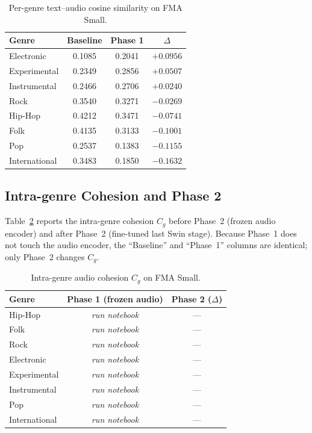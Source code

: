 \documentclass[11pt]{article}
\begin{document}
\begin{table}[h]
\centering
\label{tab:genre_align}
\begin{tabular}{lccc}
\toprule
\textbf{Genre} & \textbf{Baseline} & \textbf{Phase 1} & \textbf{$\Delta$} \\
\midrule
Electronic    & 0.1085 & 0.2041 & $+0.0956$ \\
Experimental  & 0.2349 & 0.2856 & $+0.0507$ \\
Instrumental  & 0.2466 & 0.2706 & $+0.0240$ \\
Rock          & 0.3540 & 0.3271 & $-0.0269$ \\
Hip-Hop       & 0.4212 & 0.3471 & $-0.0741$ \\
Folk          & 0.4135 & 0.3133 & $-0.1001$ \\
Pop           & 0.2537 & 0.1383 & $-0.1155$ \\
International & 0.3483 & 0.1850 & $-0.1632$ \\
\bottomrule
\end{tabular}
\caption{Per-genre text--audio cosine similarity on FMA Small.}
\end{table}

\subsection{Intra-genre Cohesion and Phase 2}

Table~\ref{tab:cohesion} reports the intra-genre cohesion $C_g$ before Phase~2
(frozen audio encoder) and after Phase~2 (fine-tuned last Swin stage). Because
Phase~1 does not touch the audio encoder, the ``Baseline'' and ``Phase~1'' columns
are identical; only Phase~2 changes $C_g$.

\begin{table}[h]
\centering
\label{tab:cohesion}
\begin{tabular}{lcc}
\toprule
\textbf{Genre} & \textbf{Phase 1 (frozen audio)} & \textbf{Phase 2 ($\Delta$)} \\
\midrule
Hip-Hop       & \emph{run notebook} & --- \\
Folk          & \emph{run notebook} & --- \\
Rock          & \emph{run notebook} & --- \\
Electronic    & \emph{run notebook} & --- \\
Experimental  & \emph{run notebook} & --- \\
Instrumental  & \emph{run notebook} & --- \\
Pop           & \emph{run notebook} & --- \\
International & \emph{run notebook} & --- \\
\bottomrule
\end{tabular}
\caption{Intra-genre audio cohesion $C_g$ on FMA Small.}
\end{table}
\end{document}
